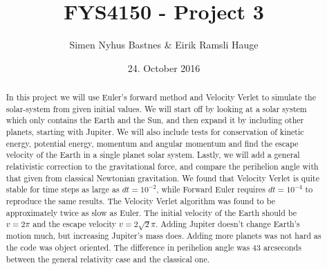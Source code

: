 \documentclass{article}
\title{FYS4150 - Project 3}
\author{Simen Nyhus Bastnes \& Eirik Ramsli Hauge}
\date{24. October 2016}
\begin{document}
\maketitle
\begin{abstract}
In this project we will use Euler's forward method and Velocity Verlet to simulate the solar-system from given initial values. We will start off by looking at a solar system which only contains the Earth and the Sun, and then expand it by including other planets, starting with Jupiter. We will also include tests for conservation of kinetic energy, potential energy, momentum and angular momentum and find the escape velocity of the Earth in a single planet solar system. Lastly, we will add a general relativistic correction to the gravitational force, and compare the perihelion angle with that given from classical Newtonian gravitation. We found that Velocity Verlet is quite stable for time steps as large as $dt = 10^{-2}$, while Forward Euler requires $dt = 10^{-4}$ to reproduce the same results. The Velocity Verlet algorithm was found to be approximately twice as slow as Euler. The initial velocity of the Earth should be $v = 2 \pi$ and the escape velocity $v = 2\sqrt{2} \pi$. Adding Jupiter doesn't change Earth's motion much, but increasing Jupiter's mass does. Adding more planets was not hard as the code was object oriented. The difference in perihelion angle was 43 arcseconds between the general relativity case and the classical one.
\end{abstract}
\end{document}
